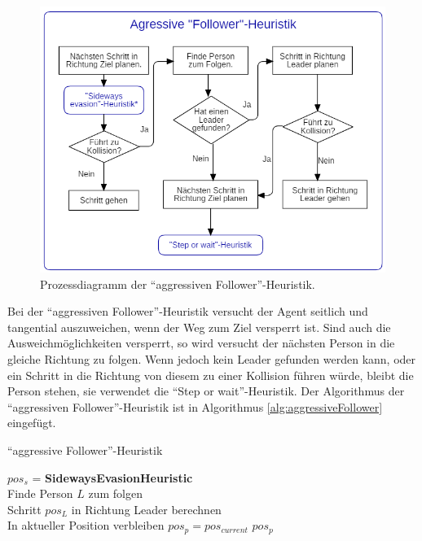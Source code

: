 \begin{figure}[H]
	\centering
		\includegraphics[width=1.0\textwidth]{pictures/model/algorithm/heuristics/aggressive_follower_heuristic.png}
	\caption{Prozessdiagramm der "`aggressiven Follower"'-Heuristik.}
	\label{fig:AFH}
\end{figure}
Bei der "`aggressiven Follower"'-Heuristik versucht der Agent seitlich und tangential auszuweichen, wenn der Weg zum Ziel versperrt ist. Sind auch die Ausweichmöglichkeiten versperrt, so wird versucht der nächsten Person in die gleiche Richtung zu folgen. Wenn jedoch kein Leader gefunden werden kann, oder ein Schritt in die Richtung von diesem zu einer Kollision führen würde, bleibt die Person stehen, sie verwendet die "`Step or wait"'-Heuristik. Der Algorithmus der "`aggressiven Follower"'-Heuristik ist in Algorithmus \ref{alg:aggressiveFollower} eingefügt.
\clearpage
\begin{algorithm} [H]
	\caption{"`aggressive Follower"'-Heuristik}
	\label{alg:aggressiveFollower}
	
	\AggressiveFollowerHeuristic{} {
		$pos_s$ = \textbf{SidewaysEvasionHeuristic}\\
		 {
			Finde Person $L$ zum folgen \\
			 { 
				Schritt $pos_L$ in Richtung Leader berechnen \\
				 {
					In aktueller Position verbleiben $pos_p = pos_{current}$ 
				} 
			} 
		} 
		\Return $pos_p$
	}
\end{algorithm}

